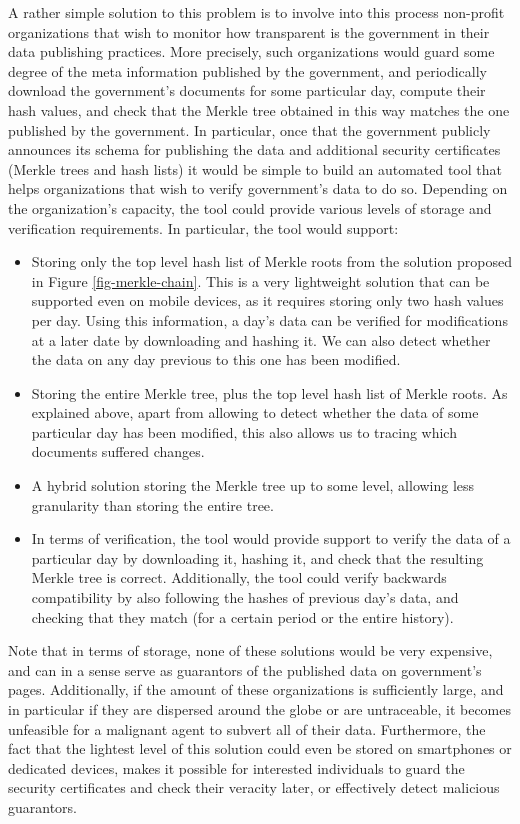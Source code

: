 A rather simple solution to this problem is to involve into this process non-profit organizations that wish to monitor how transparent is the government in their data publishing practices. More precisely, such organizations would guard some degree of the meta information published by the government, and periodically download the government's documents for some particular day, compute their hash values, and check that the Merkle tree obtained in this way matches the one published by the government. In particular, once that the government publicly announces its schema for publishing the data and additional security certificates (Merkle trees and hash lists) it would be simple to build an automated tool that helps organizations that wish to verify government's data to do so. Depending on  the organization's capacity, the tool could provide various levels of storage and verification requirements. In particular, the tool would support:
\begin{itemize}
\item Storing only the top level hash list of Merkle roots from the solution proposed in Figure \ref{fig-merkle-chain}. This is a very lightweight solution that can be supported even on mobile devices, as it requires storing only two hash values per day. Using this information, a day's data can be verified for modifications at a later date by downloading and hashing it. We can also detect whether the data on any day previous to this one has been modified.
\item Storing the entire Merkle tree, plus the top level hash list of Merkle roots. As explained above, apart from allowing to detect whether the data of some particular day has been modified, this also allows us to  tracing which documents suffered changes.
\item A hybrid solution storing the Merkle tree up to some level, allowing less granularity than storing the entire tree.
\item In terms of verification, the tool would provide support to verify the data of a particular day by downloading it, hashing it, and check that the resulting Merkle tree is correct. Additionally, the tool could verify backwards compatibility by also following the hashes of previous day's data, and checking that they match (for a certain period or the entire history).
\end{itemize}

Note that in terms of storage, none of these solutions would be very expensive, and can in a sense serve as guarantors of the published data on government's pages. Additionally, if the amount of these organizations is sufficiently large, and in particular if they are dispersed around the globe or are untraceable, it becomes unfeasible for a malignant agent to subvert all of their data. Furthermore, the fact that the lightest level of this solution could even be stored on smartphones or dedicated devices, makes it possible for interested individuals to guard the security certificates and check their veracity later, or effectively detect malicious guarantors.